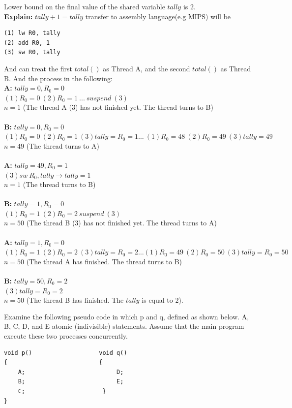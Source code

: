\documentclass[12pt]{article}
\newenvironment{sol}[1][Solution]{\begin{trivlist}\item[\hskip\labelsep {\bfseries #1:}]}{\end{trivlist}}
\begin{document}
\begin{enumerate}
\begin{sol}
Lower bound on the final value of the shared variable $tally$ is 2.\\
\textbf{Explain: } $tally + 1 = tally$ transfer to assembly language(e.g MIPS) will be 
\begin{verbatim}
(1) lw R0, tally
(2) add R0, 1
(3) sw R0, tally 
\end{verbatim}
And can treat the first $total()$ as Thread A, and the second $total()$ as Thread B. And the process in the following:\\
\textbf{A:} $tally = 0, R_0 = 0 $ \\ 
$ (1) R_0 = 0 \ (2) R_0 = 1 \ ... \ suspend \ (3) \ $ \\ 
$n = 1$  (The thread A (3) has not finished yet. The thread turns to B)\\
\\
\textbf{B:} $tally = 0, R_0=0$ \\
$ (1) R_0 = 0 \ (2) R_0 = 1 \ (3) tally = R_0 = 1 \dots \ (1) R_0 = 48 \ (2) R_0 = 49 \ (3) tally = 49$ \\ 
$n = 49$  (The thread turns to A)\\
\\
\textbf{A:} $tally = 49, R_0 = 1$\\
$ (3) sw \ R_0, tally \rightarrow tally = 1$\\
$n = 1$ (The thread turns to B)\\
\\
\textbf{B:} $tally = 1, R_0 = 0$\\
$(1) R_0 = 1 \ (2) R_0 = 2 \ suspend\ (3) $\\
$n = 50$ (The thread B (3) has not finished yet. The thread turns to A)\\
\\
\textbf{A:} $tally = 1, R_0 = 0$\\
$(1) R_0 = 1 \ (2) R_0 = 2 \ (3) tally = R_0 = 2 \dots (1)R_0 = 49\ (2) R_0 = 50 \ (3)tally = R_0 = 50$\\
$n = 50$ (The thread A has finished. The thread turns to B)\\
\\
\textbf{B:} $tally = 50, R_0 = 2$\\
$(3) tally = R_0 = 2$\\
$n = 50$ (The thread B has finished. The $tally$ is equal to $2$).

\end{sol}

\newpage
\item Examine the following pseudo code in which p and q, defined as shown below. A, B, C, D, and E atomic (indivisible) statements. Assume that the main program execute these two processes concurrently.
 \begin{verbatim}
void p()                   void q()
{                          {
    A;                          D;
    B;                          E;
    C;                      }
}


\end{verbatim}
\end{enumerate}
\end{document}

